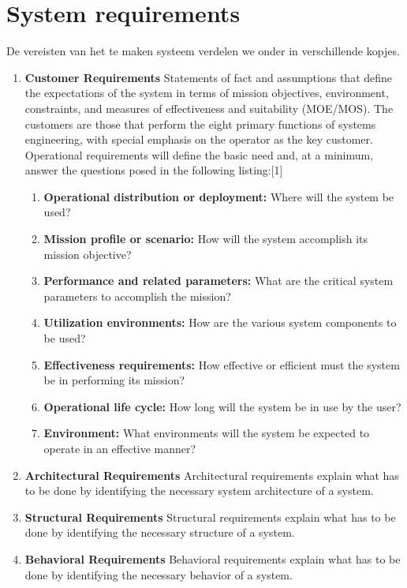 \documentclass{article}
\begin{document}
\section{System requirements}
De vereisten van het te maken systeem verdelen we onder in verschillende kopjes.
\begin{enumerate}
	
	\item{\textbf{Customer Requirements}}
	Statements of fact and assumptions that define the expectations of the system in terms of mission objectives, environment, constraints, and measures of effectiveness and suitability (MOE/MOS). The customers are those that perform the eight primary functions of systems engineering, with special emphasis on the operator as the key customer. Operational requirements will define the basic need and, at a minimum, answer the questions posed in the following listing:[1]
	\begin{enumerate}
		\item{\textbf{Operational distribution or deployment:}} Where will the system be used?
		\item{\textbf{Mission profile or scenario:}} How will the system accomplish its mission objective?
		\item{\textbf{Performance and related parameters:}} What are the critical system parameters to accomplish the mission?
		\item{\textbf{Utilization environments:}} How are the various system components to be used?
		\item{\textbf{Effectiveness requirements:}} How effective or efficient must the system be in performing its mission?
		\item{\textbf{Operational life cycle:}} How long will the system be in use by the user?
		\item{\textbf{Environment:}} What environments will the system be expected to operate in an effective manner?
	\end{enumerate}
	\item{\textbf{Architectural Requirements}}
	Architectural requirements explain what has to be done by identifying the necessary system architecture of a system.
	\item{\textbf{Structural Requirements}}
	Structural requirements explain what has to be done by identifying the necessary structure of a system.
	\item{\textbf{Behavioral Requirements}}
	Behavioral requirements explain what has to be done by identifying the necessary behavior of a system.

\end{enumerate}
\end{document}
